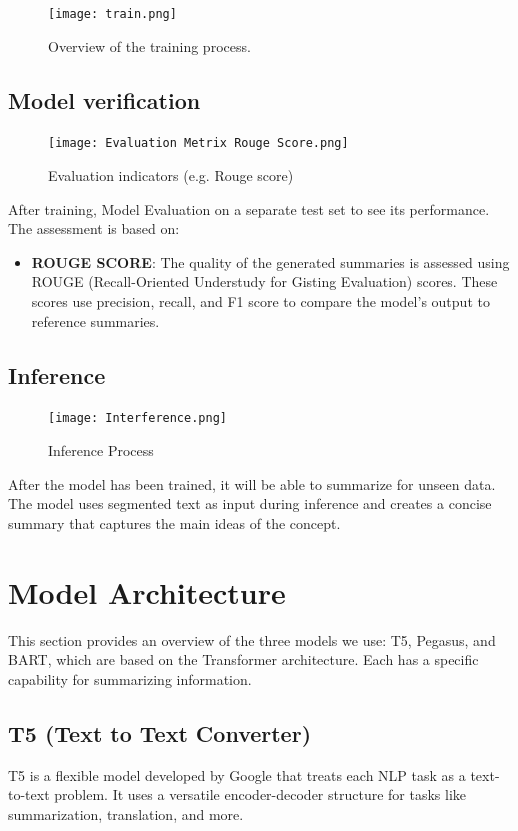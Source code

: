 \documentclass[conference]{IEEEtran}
\begin{document}
\begin{figure}[htp]
    \centering
    \texttt{[image: train.png]} 
    \caption{Overview of the training process.}
    \label{fig:training}
\end{figure}



\subsection{Model verification}

\begin{figure}[htbp]
    \centering
    \texttt{[image: Evaluation Metrix Rouge Score.png]} %
    \caption{Evaluation indicators (e.g. Rouge score)}
    \label{image:inspection}
\end{figure}
After training, Model Evaluation on a separate test set to see its performance. The assessment is based on:
\begin{itemize}    \item \textbf{ROUGE SCORE}: The quality of the generated summaries is assessed using ROUGE (Recall-Oriented Understudy for Gisting Evaluation) scores. These scores use precision, recall, and F1 score to compare the model's output to reference summaries.
\end{itemize}



\subsection{Inference}
\begin{figure}[htbp]
    \centering
    \texttt{[image: Interference.png]} %
    \caption{Inference Process}
    \label{image:inference}
\end{figure}
After the model has been trained, it will be able to summarize for unseen data. The model uses segmented text as input during inference and creates a concise summary that captures the main ideas of the concept.



\section{Model Architecture}
This section provides an overview of the three models we use: T5, Pegasus, and BART, which are based on the Transformer architecture. Each has a specific capability for summarizing information.

\subsection{T5 (Text to Text Converter)}
T5 is a flexible model developed by Google that treats each NLP task as a text-to-text problem. It uses a versatile encoder-decoder structure for tasks like summarization, translation, and more.
\end{document}
